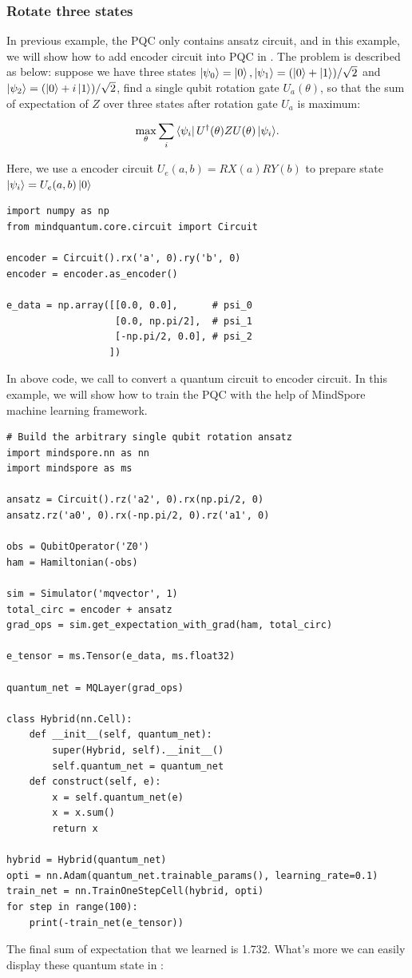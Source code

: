 \subsubsection{Rotate three states}
In previous example, the PQC only contains ansatz circuit, and in this example, we will show how to add encoder circuit into PQC in \MindQuantum. The problem is described as below: suppose we have three states $\ket{\psi_0}=\ket{0},\ket{\psi_1}=(\ket{0}+\ket{1})/\sqrt{2}$ and $\ket{\psi_2}=(\ket{0}+i\ket{1})/\sqrt{2}$, find a single qubit rotation gate $U_a(\theta)$, so that the sum of expectation of $Z$ over three states after rotation gate $U_a$ is maximum:

\begin{equation}
  \max_{\theta}\sum_i{\bra{\psi_i}U^\dagger(\theta)ZU(\theta)\ket{\psi_i}}.
\end{equation}

Here, we use a encoder circuit $U_e(a, b) = RX(a)RY(b)$ to prepare state $\ket{\psi_i}=U_e(a, b)\ket{0}$
\begin{lstlisting}
import numpy as np
from mindquantum.core.circuit import Circuit

encoder = Circuit().rx('a', 0).ry('b', 0)
encoder = encoder.as_encoder()

e_data = np.array([[0.0, 0.0],      # psi_0
                   [0.0, np.pi/2],  # psi_1
                   [-np.pi/2, 0.0], # psi_2
                  ])
\end{lstlisting}
In above code, we call \asencoder to convert a quantum circuit to encoder circuit. In this example, we will show how to train the PQC with the help of MindSpore machine learning framework.

\begin{lstlisting}
# Build the arbitrary single qubit rotation ansatz
import mindspore.nn as nn
import mindspore as ms

ansatz = Circuit().rz('a2', 0).rx(np.pi/2, 0)
ansatz.rz('a0', 0).rx(-np.pi/2, 0).rz('a1', 0)

obs = QubitOperator('Z0')
ham = Hamiltonian(-obs)

sim = Simulator('mqvector', 1)
total_circ = encoder + ansatz
grad_ops = sim.get_expectation_with_grad(ham, total_circ)

e_tensor = ms.Tensor(e_data, ms.float32)

quantum_net = MQLayer(grad_ops)

class Hybrid(nn.Cell):
    def __init__(self, quantum_net):
        super(Hybrid, self).__init__()
        self.quantum_net = quantum_net
    def construct(self, e):
        x = self.quantum_net(e)
        x = x.sum()
        return x

hybrid = Hybrid(quantum_net)
opti = nn.Adam(quantum_net.trainable_params(), learning_rate=0.1)
train_net = nn.TrainOneStepCell(hybrid, opti)
for step in range(100):
    print(-train_net(e_tensor))
\end{lstlisting}
The final sum of expectation that we learned is 1.732. What's more we can easily display these quantum state in \MindQuantum:

